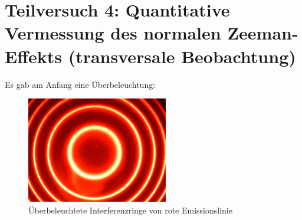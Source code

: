 \section{Teilversuch 4: Quantitative Vermessung des normalen Zeeman-Effekts (transversale Beobachtung)}
	Es gab am Anfang eine Überbeleuchtung:
	\begin{figure}[!ht]
		\vspace{-0.2em}
	    \centering
	    \includegraphics[width=0.55\textwidth]{images/Capture_810.bmp.jpg}
	    \caption{Überbeleuchtete Interferenzringe von rote Emissionslinie}
	    \label{fig:red-fringes}
	    \vspace{-1em}
	\end{figure}

